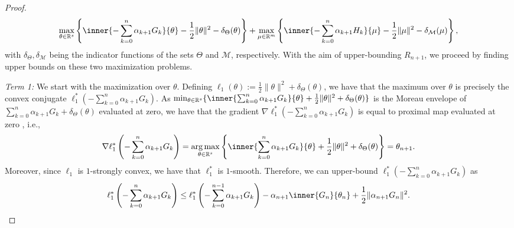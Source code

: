 \documentclass[11pt,a4paper]{article}
\theoremstyle{definition}
\DeclareMathOperator*{\argmax}{arg\,max}
\begin{document}
\begin{proof}
\begin{align*}
    \max_{\theta \in \mathbb R^s} \left\{ \inner{-\sum_{k=0}^n \alpha_{k+1} G_k}{\theta} - \frac{1}{2}\|\theta\|^2 - \delta_{\Theta}(\theta)\right\} + \max_{\mu \in \mathbb R^m} \left\{ \inner{-\sum_{k=0}^n \alpha_{k+1} H_k}{\mu} - \frac{1}{2}\|\mu\|^2 - \delta_{\mathcal M}(\mu)\right\},
\end{align*}
with $\delta_\Theta, \delta_{\mathcal M}$ being the indicator functions of the sets $\Theta$ and $\mathcal M$, respectively. With the aim of upper-bounding $R_{n+1}$, we proceed by finding upper bounds on these two maximization problems.

\medskip

\emph{Term 1:} We start with the maximization over $\theta$. Defining $\ell_1(\theta):= \frac{1}{2}\|\theta\|^2 + \delta_{\Theta}(\theta)$, we have that the maximum over $\theta$ is precisely the convex conjugate $\ell_1^*(-\sum_{k=0}^n \alpha_{k+1} G_k)$. As $\min_{\theta \in \mathbb R^s} \{ \inner{\sum_{k=0}^n \alpha_{k+1} G_k}{\theta} + \frac{1}{2}\|\theta\|^2 + \delta_{\Theta}(\theta)\}$ is the Moreau envelope of $\sum_{k=0}^n \alpha_{k+1} G_k + \delta_{\Theta}(\theta)$ evaluated at zero, we have that the gradient $\nabla \ell_1^*(-\sum_{k=0}^n \alpha_{k+1} G_k)$ is equal to proximal map evaluated at zero \cite[Theorem~2.26]{rockafellar2009variational}, i.e.,
\begin{align*}
    \nabla \ell_1^*\left(-\sum_{k=0}^n \alpha_{k+1} G_k\right) = \argmax_{\theta \in \mathbb R^s} \left\{ \inner{\sum_{k=0}^n \alpha_{k+1} G_k}{\theta} + \frac{1}{2}\|\theta\|^2 + \delta_{\Theta}(\theta) \right\}=\theta_{n+1}.
\end{align*}
Moreover, since $\ell_1$ is $1$-strongly convex, we have that $\ell_1^*$ is $1$-smooth. Therefore, we can upper-bound $\ell_1^*(-\sum_{k=0}^n \alpha_{k+1} G_k)$ as
\begin{align*}
    \ell_1^*\left( -\sum_{k=0}^n \alpha_{k+1} G_k \right) \leq \ell_1^*\left( -\sum_{k=0}^{n-1} \alpha_{k+1} G_k \right) - \alpha_{n+1} \inner{G_n}{\theta_n} + \frac{1}{2} \|\alpha_{n+1} G_n\|^2.
\end{align*}

\medskip


\end{proof}
\end{document}
